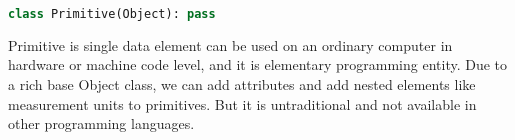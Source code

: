 \secdown

\begin{lstlisting}[language=Python]
class Primitive(Object): pass
\end{lstlisting}

\noindent
Primitive is single data element can be used on an ordinary computer in hardware
or machine code level, and it is elementary programming entity. Due to a rich
base Object class, we can add attributes and add nested elements like
measurement units to primitives. But it is untraditional and not available in
other programming languages.

\secup